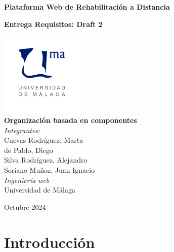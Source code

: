 \documentclass{article}
\begin{document}
	
	\begin{titlepage}
		\centering
		\vspace*{3cm}
		
		{\Huge \textbf{Plataforma Web de Rehabilitación a Distancia}\\[0.5cm]}
		
		{\Large \textbf{Entrega Requisitos: Draft 2}\\[0.5cm]}
		
		\vspace{2cm}
		\includegraphics[width=0.3\textwidth]{images/uma_logo.jpg}\\[1cm]
		
		{\LARGE \textbf{Organización basada en componentes}\\[0.5cm]}
		{\large \textit{Integrantes:}\\
			Cuevas Rodríguez, Marta\\
			de Pablo, Diego\\
			Silva Rodríguez, Alejandro\\
			Soriano Muñoz, Juan Ignacio\\
		}
		\vfill
		{\large \textit{Ingeniería web}\\
			Universidad de Málaga\\
		}
		
		\vfill
		
		{\large Octubre 2024}
	\end{titlepage}
	
	\tableofcontents
	
	\newpage
	
	\section{Introducción}
\end{document}
